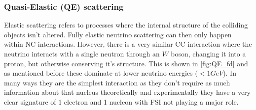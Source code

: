 \documentclass[a4paper,12pt]{article}
\begin{document}
\subsubsection{Quasi-Elastic (QE) scattering}
Elastic scattering refers to processes where the internal structure of the colliding objects isn't altered.
Fully elastic neutrino scattering can then only happen within NC interactions.
However, there is a very similar CC interaction where the neutrino interacts with a single neutron through an $W$ boson, changing it into a proton, but otherwise conserving it's structure.
This is shown in \cref{fig:QE_fd} and as mentioned before these dominate at lower neutrino energies ($< 1\si{GeV}$).
In many ways they are the simplest interaction as they don't require as much information about that nucleus theoretically and experimentally they have a very clear signature of 1 electron and 1 nucleon with FSI not playing a major role.
\end{document}
